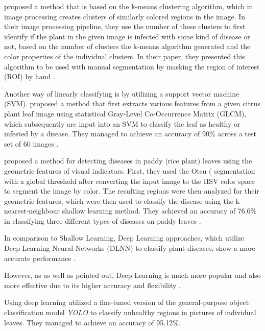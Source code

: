\documentclass[draft,final]{vutinfth} %
\begin{document}
\citeauthor{kaur_semi-automatic_2018} proposed a method that is based on the k-means clustering algorithm, which in image processing creates clusters of similarly colored regions in the image. In their image processing pipeline, they use the number of these clusters to first identify if the plant in the given image is infected with some kind of disease or not, based on the number of clusters the k-means algorithm generated and the color properties of the individual clusters. In their paper, they presented this algorithm to be used with manual segmentation by masking the region of interest (ROI) by hand \cite{kaur_semi-automatic_2018}.

Another way of linearly classifying is by utilizing a support vector machine (SVM). \citeauthor{prakash_detection_2017} proposed a method that first extracts various features from a given citrus plant leaf image using statistical Gray-Level Co-Occurrence Matrix (GLCM), which subsequently are input into an SVM to classify the leaf as healthy or infested by a disease. They managed to achieve an accuracy of 90\% across a test set of 60 images \cite{prakash_detection_2017}. 

\citeauthor{suresha_recognition_2017} proposed a method for detecting diseases in paddy (rice plant) leaves using the geometric features of visual indicators. First, they used the Otsu (\citeauthor{otsu_threshold_1979} segmentation with a global threshold after converting the input image to the HSV color space to segment the image by color. The resulting regions were then analyzed for their geometric features, which were then used to classify the disease using the k-nearest-neighbour shallow learning method. They achieved an accuracy of 76.6\% in classifying three different types of diseases on paddy leaves \cite{suresha_recognition_2017}.

In comparison to Shallow Learning, Deep Learning approaches, which utilize Deep Learning Neural Networks (DLNN) to classify plant diseases, show a more accurate performance \cite{yao_machine_2023, sujatha_performance_2021}.

However, as \citeauthor{yao_machine_2023} as well as \citeauthor{sujatha_performance_2021} pointed out, Deep Learning is much more popular and also more effective due to its higher accuracy and flexibility \cite{yao_machine_2023, sujatha_performance_2021}.

Using deep learning \citeauthor{khalid_real-time_2023} utilized a fine-tuned version of the general-purpose object classification model \textit{YOLO} to classify unhealthy regions in pictures of individual leaves. They managed to achieve an accuracy of 95.12\%. \cite{khalid_real-time_2023}.
\end{document}
